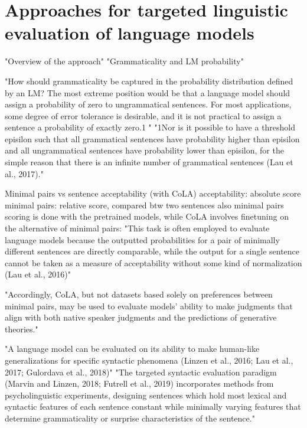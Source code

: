 \section{Approaches for targeted linguistic evaluation of language models}


"Overview of the approach"
"Grammaticality and LM probability" \citep{marvin2018targeted}

"How should grammaticality be captured in the probability distribution defined by an LM? The most extreme position would be that a language model should assign a probability of zero to ungrammatical sentences. For most applications, some degree of error tolerance is desirable, and  it is not practical to assign a sentence a probability of exactly zero.1 " "1Nor is it possible to have a threshold episilon such that all grammatical sentences have probability higher than episilon and all ungrammatical sentences have probability lower than episilon, for the simple reason that there is an infinite number of grammatical sentences (Lau et al., 2017)."  \citep{marvin2018targeted}

Minimal pairs vs sentence acceptability (with CoLA)
acceptability: absolute score
minimal pairs: relative score, compared btw two sentences
also minimal pairs scoring is done with the pretrained models, while CoLA involves finetuning
on the alternative of minimal pairs:
"This task is often employed to evaluate language models because the outputted
probabilities for a pair of minimally different sentences are directly comparable, while the output for a single sentence cannot be taken as a measure
of acceptability without some kind of normalization (Lau et al., 2016)"

"Accordingly, CoLA, but not datasets based solely on preferences between minimal pairs, may be used to evaluate models’ ability to make judgments that align with both native speaker judgments and the predictions of generative theories."

"A language model can be evaluated on its ability to make human-like generalizations for specific syntactic phenomena (Linzen et al., 2016; Lau et al., 2017; Gulordava et al., 2018)"  \citep{hu2020systematic}
"The targeted syntactic evaluation paradigm (Marvin and Linzen, 2018; Futrell et al., 2019) incorporates methods from psycholinguistic experiments,
designing sentences which hold most lexical and syntactic features of each sentence constant while minimally varying features that determine grammaticality or surprise characteristics of the sentence."  \citep{hu2020systematic}

